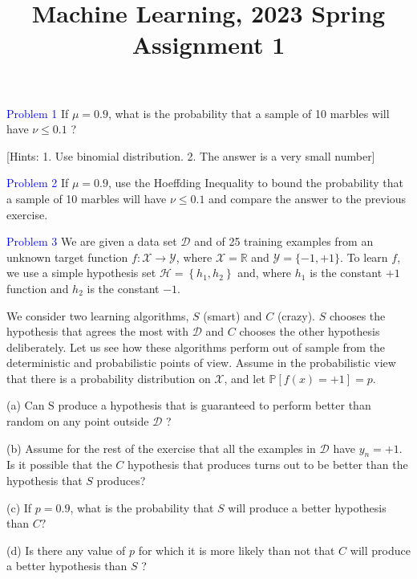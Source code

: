 \documentclass{article}
\title{Machine Learning, 2023 Spring\\Assignment 1}
\begin{document}
\maketitle

\begin{abstract}

\end{abstract}

\textcolor{blue}{Problem 1}
If $\mu=0.9$, what is the probability that a sample of 10 marbles will have $\nu \leq 0.1$ ?

[Hints: 1. Use binomial distribution. 2. The answer is a very small number]


\newpage


\textcolor{blue}{Problem 2}
If $\mu=0.9$, use the Hoeffding Inequality to bound the probability that a sample of 10 marbles will have $\nu \leq 0.1$ and compare the answer to the previous exercise.

\newpage

\textcolor{blue}{Problem 3}
We are given a data set $\mathcal{D}$ and of 25 training examples from an unknown target function $f: \mathcal{X} \rightarrow \mathcal{Y}$, where $\mathcal{X}=\mathbb{R}$ and $\mathcal{Y}=\{-1,+1\}$. To learn $f$, we use a simple hypothesis set $\mathcal{H}=\left\{h_{1}, h_{2}\right\}$ and, where $h_{1}$ is the constant $+1$ function and $h_{2}$ is the constant $-1$.

We consider two learning algorithms, $S$ (smart) and $C$ (crazy). $S$ chooses the hypothesis that agrees the most with $\mathcal{D}$ and $C$ chooses the other hypothesis deliberately. Let us see how these algorithms perform out of sample from the deterministic and probabilistic points of view. Assume in the probabilistic view that there is a probability distribution on $\mathcal{X}$, and let $\mathbb{P}[f(x)=+1]=p$.

(a) Can $\mathrm{S}$ produce a hypothesis that is guaranteed to perform better than random on any point outside $\mathcal{D}$ ?

(b) Assume for the rest of the exercise that all the examples in $\mathcal{D}$ have $y_{n}=+1$. Is it possible that the $C$ hypothesis that produces turns out to be better than the hypothesis that $S$ produces? 

(c) If $p=0.9$, what is the probability that $S$ will produce a better hypothesis than $C ?$

(d) Is there any value of $p$ for which it is more likely than not that $C$ will produce a better hypothesis than $S$ ?
\end{document}
